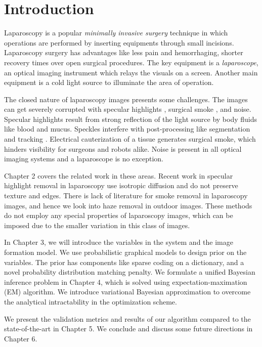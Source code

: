 
\newcommand{\etas}{\ensuremath{\eta_{\mathrm{s}}}}


\chapter{Introduction}

Laparoscopy is a popular \emph{minimally invasive surgery} technique in which operations are performed by inserting equipments through small incisions. Laparoscopy surgery has advantages like less pain and hemorrhaging, shorter recovery times over open surgical procedures. The key equipment is a \emph{laparoscope}, an optical imaging instrument which relays the visuals on a screen. Another main equipment is a cold light source to illuminate the area of operation.

The closed nature of laparoscopy images presents some challenges. The images can get severely corrupted with specular highlights \cite{stoyanov2005removing, saint2011detection}, surgical smoke \cite{barrett2003surgical}, and noise. Specular highlights result from strong reflection of the light source by body fluids like blood and mucus. Speckles interfere with post-processing like segmentation \cite{prokopetc2015segmentation, voros2007segmentation} and tracking \cite{wolf2011tracking}. Electrical cauterization of a tissue generates surgical smoke, which hinders visibility for surgeons and robots alike. Noise is present in all optical imaging systems and a laparoscope is no exception.

Chapter 2 covers the related work in these areas. Recent work in specular highlight removal in laparoscopy use isotropic diffusion and do not preserve texture and edges. There is lack of literature for smoke removal in laparoscopy images, and hence we look into haze removal in outdoor images. These methods do not employ any special properties of laparoscopy images, which can be imposed due to the smaller variation in this class of images.

In Chapter 3, we will introduce the variables in the system and the image formation model. We use probabilistic graphical models to design prior on the variables. The prior has components like sparse coding on a dictionary, and a novel probability distribution matching penalty. We formulate a unified Bayesian inference problem in Chapter 4, which is solved using expectation-maximation (EM) algorithm. We introduce variational Bayesian approximation to overcome the analytical intractability in the optimization scheme. 

We present the validation metrics and results of our algorithm compared to the state-of-the-art in Chapter 5. We conclude and discuss some future directions in Chapter 6.








